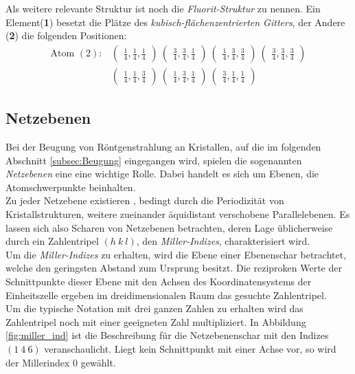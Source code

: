 Als weitere relevante Struktur ist noch die
\textit{Fluorit-Struktur} zu nennen.
Ein Element(\textbf{1}) besetzt die Plätze des
\textit{kubisch-flächenzentrierten Gitters},
der Andere (\textbf{2}) die folgenden
Positionen:
\begin{align}
\label{eqn:9*}
\text{Atom }(2) :&
\begin{pmatrix}
\frac{1}{4}, \frac{1}{4}, \frac{1}{4}
\end{pmatrix}\
\begin{pmatrix}
\frac{3}{4}, \frac{3}{4}, \frac{1}{4}
\end{pmatrix}\
\begin{pmatrix}
\frac{1}{4}, \frac{3}{4}, \frac{3}{4}
\end{pmatrix}\
\begin{pmatrix}
\frac{3}{4}, \frac{3}{4}, \frac{3}{4}
\end{pmatrix}\\
&\begin{pmatrix}
\frac{1}{4}, \frac{1}{4}, \frac{3}{4}
\end{pmatrix}\
\begin{pmatrix}
\frac{1}{4}, \frac{3}{4}, \frac{1}{4}
\end{pmatrix}\
\begin{pmatrix}
\frac{3}{4}, \frac{1}{4}, \frac{1}{4}
\end{pmatrix}\
\end{align}

\subsection{Netzebenen}
\label{subsec:netzebenen}
Bei der Beugung von Röntgenstrahlung an Kristallen,
auf die im folgenden Abschnitt \ref{subsec:Beugung}
eingegangen wird, spielen die sogenannten \textit{Netzebenen}
eine eine wichtige Rolle. Dabei handelt es sich
um Ebenen, die Atomschwerpunkte beinhalten.\\
Zu jeder Netzebene existieren , bedingt durch die
Periodizität von Kristallstrukturen, weitere zueinander
äquidistant verschobene Parallelebenen.
Es lassen sich also Scharen von Netzebenen betrachten,
deren Lage üblicherweise durch ein Zahlentripel $(h \ k \ l)$,
den \textit{Miller-Indizes}, charakterisiert wird.\\
Um die \textit{Miller-Indizes} zu erhalten, wird die
Ebene einer Ebenenschar betrachtet, welche den geringsten
Abstand zum Ursprung besitzt. Die reziproken Werte
der Schnittpunkte dieser Ebene mit den Achsen des
Koordinatensystems der Einheitszelle ergeben im
dreidimensionalen Raum das gesuchte Zahlentripel.\\
Um die typische Notation mit drei ganzen Zahlen zu erhalten
wird das Zahlentripel noch mit einer geeigneten Zahl
multipliziert. In Abbildung \ref{fig:miller_ind}
ist die Beschreibung für die Netzebenenschar mit den
Indizes $(1 \ 4 \ 6)$ veranschaulicht.
Liegt kein Schnittpunkt mit einer
Achse vor, so wird der Millerindex $0$ gewählt.

